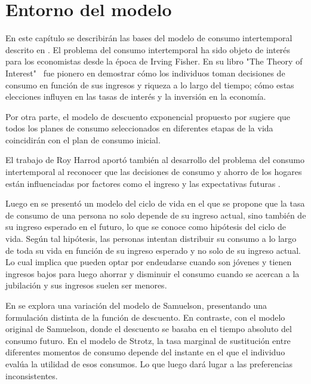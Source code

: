 \chapter{Entorno del modelo} \label{cap_2}
En este capítulo se describirán las bases del modelo de consumo intertemporal descrito en \parencite{feigenbaum2021deviation}.  El problema del consumo intertemporal ha sido objeto de interés para los economistas desde la época de Irving Fisher. En su libro "The Theory of Interest" \,   \parencite{fisher1930theory} fue pionero en demostrar cómo los individuos toman decisiones de consumo en función de sus ingresos y riqueza a lo largo del tiempo; cómo estas elecciones influyen en las tasas de interés y la inversión en la economía.

Por otra parte, el modelo de descuento exponencial propuesto por \textcite{Samuelson37} sugiere que todos los planes de consumo seleccionados en diferentes etapas de la vida coincidirán con el plan de consumo inicial. %

El trabajo de Roy Harrod aportó también al desarrollo del problema del consumo intertemporal al reconocer que las decisiones de consumo y ahorro de los hogares están influenciadas por factores como el ingreso y las expectativas futuras \parencite{harrod1948towards}.

Luego en \parencite{modigliani1954utility} se presentó un modelo del ciclo de vida en el que se propone que la tasa de consumo de una persona no solo depende de su ingreso actual, sino también de su ingreso esperado en el futuro, lo que se conoce como hipótesis del ciclo de vida. Según tal hipótesis, las personas intentan distribuir su consumo a lo largo de toda su vida en función de su ingreso esperado y no solo de su ingreso actual. Lo cual implica que pueden optar por endeudarse cuando son jóvenes y tienen ingresos bajos para luego ahorrar y disminuir el consumo cuando se acercan a la jubilación y sus ingresos suelen ser menores.

En \parencite{Strotz55} se explora una variación del modelo de Samuelson, presentando una formulación distinta de la función de descuento. %
En contraste, con el modelo original de Samuelson, donde el descuento se basaba en el tiempo absoluto del consumo futuro. En el modelo de Strotz, la tasa marginal de sustitución entre diferentes momentos de consumo depende del instante en el que el individuo evalúa la utilidad de esos consumos. %
Lo que luego dará lugar a las preferencias inconsistentes.


